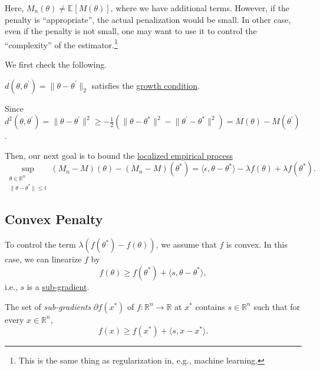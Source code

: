 \begin{intuition}
	Here, \(M_n (\theta ) \neq \mathbb{E}_{}\left[M(\theta ) \right] \), where we have additional terms. However, if the penalty is ``appropriate'', the actual penalization would be small. In other case, even if the penalty is not small, one may want to use it to control the ``complexity'' of the estimator.\footnote{This is the same thing as regularization in, e.g., machine learning.}
\end{intuition}

We first check the following.

\begin{claim}
	\(d(\theta , \theta ^{\prime} ) = \lVert \theta - \theta ^{\prime} \rVert _2 \) satisfies the \hyperref[def:growth-condition*]{growth condition}.
\end{claim}
\begin{explanation}
	Since \(d^2(\theta , \theta ^{\prime} ) = \lVert \theta - \theta ^{\prime} \rVert ^2 \geq -\frac{1}{2} \left( \lVert \theta - \theta ^{\ast} \rVert ^2 - \lVert \theta ^{\prime} - \theta ^{\ast} \rVert ^2 \right) = M(\theta ) - M(\theta ^{\prime} )\).
\end{explanation}

Then, our next goal is to bound the \hyperref[def:localized-EP]{localized empirical process}
\[
	\sup _{\substack{\theta \in \mathbb{R} ^n \\ \lVert \theta - \theta ^{\ast}  \rVert \leq t }} (M_n - M)(\theta ) - (M_n - M)(\theta ^{\ast})
	= \langle \epsilon , \theta - \theta ^{\ast} \rangle - \lambda f(\theta ) + \lambda f(\theta ^{\ast} ).
\]

\subsection{Convex Penalty}
To control the term \(\lambda (f(\theta ^{\ast} ) - f(\theta ))\), we assume that \(f\) is convex. In this case, we can linearize \(f\) by
\[
	f(\theta ) \geq f(\theta ^{\ast} ) + \langle s, \theta - \theta ^{\ast}  \rangle,
\]
i.e., \(s\) is a \hyperref[def:sub-gradient]{sub-gradient}.

\begin{definition}\label{def:sub-gradient}
	The set of \emph{sub-gradients} \(\partial f(x^{\ast} )\) of \(f \colon \mathbb{R} ^n \to \mathbb{R} \) at \(x^{\ast} \) contains \(s \in \mathbb{R} ^n\) such that for every \(x \in \mathbb{R} ^n\),
	\[
		f(x) \geq f(x^{\ast} ) + \langle s, x - x^{\ast}  \rangle.
	\]
\end{definition}

